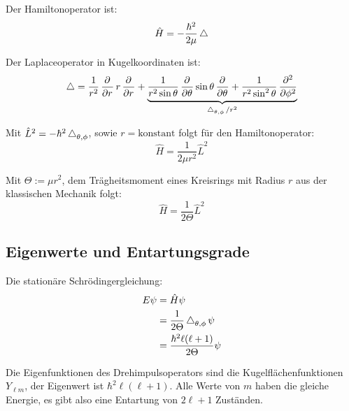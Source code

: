 Der Hamiltonoperator ist:
\[
	\hat H = - \frac{\hbar^2}{2\mu} \operatorname{\bigtriangleup}
\]

\newcommand\legendrian{\laplace_{\theta,\phi}}

Der Laplaceoperator in Kugelkoordinaten ist:
\[
	\laplace = \frac1{r^2} \dpd{}r r \dpd{}r + \underbrace{\frac1{r^2\sin\theta} \dpd{}\theta \sin\theta \dpd{}\theta + \frac1{r^2\sin^2\theta} \dpd[2]{}\phi}_{\legendrian/r^2}
\]

Mit $\hat L^2 = - \hbar^2 \legendrian$, sowie $r = \text{konstant}$ folgt für
den Hamiltonoperator:
\[
	\hat H = \frac{1}{2\mu r^2} \hat L^2
\]

Mit $\Theta := \mu r^2$, dem Trägheitsmoment eines Kreisrings mit Radius $r$
aus der klassischen Mechanik folgt:
\[
	\hat H = \frac{1}{2\Theta} \hat L^2
\]

\subsection{Eigenwerte und Entartungsgrade}

Die stationäre Schrödingergleichung:
\begin{align*}
	E \psi &= \hat H \psi \\
			  &= \frac1{2\Theta} \legendrian \psi \\
		   &= \frac{\hbar^2 \ell (\ell + 1)}{2 \Theta} \psi
\end{align*}

Die Eigenfunktionen des Drehimpulsoperators sind die Kugelflächenfunktionen
$Y_{\ell m}$, der Eigenwert ist $\hbar^2 \ell(\ell+1)$. Alle Werte von $m$
haben die gleiche Energie, es gibt also eine Entartung von $2\ell+1$ Zuständen.


\IfFileExists{\bibliographyfile}{
}{}




